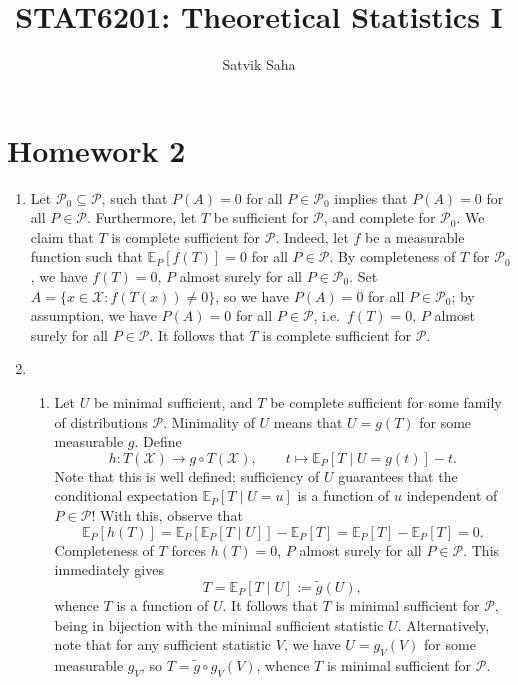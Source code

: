 \documentclass[11pt]{article}
\title{\bfseries STAT6201: Theoretical Statistics I}
\author{Satvik Saha}
\date{}
\begin{document}
    \maketitle

    \section*{Homework 2}

    \begin{enumerate}

    \item Let $\mathcal{P}_0 \subseteq \mathcal{P}$, such that $P(A) = 0$ for
    all $P \in \mathcal{P}_0$ implies that $P(A) = 0$ for all $P \in
    \mathcal{P}$.
    Furthermore, let $T$ be sufficient for $\mathcal{P}$, and complete for
    $\mathcal{P}_0$.
    We claim that $T$ is complete sufficient for $\mathcal{P}$.
    Indeed, let $f$ be a measurable function such that $\mathbb{E}_P[f(T)] =
    0$ for all $P \in \mathcal{P}$.
    By completeness of $T$ for $\mathcal{P}_0$, we have $f(T) = 0$, $P$ almost
    surely for all $P \in \mathcal{P}_0$.
    Set $A = \{x \in \mathcal{X}\colon f(T(x)) \neq 0\}$, so we have $P(A) =
    0$ for all $P \in \mathcal{P}_0$; by assumption, we have $P(A) = 0$ for
    all $P \in \mathcal{P}$, i.e.\ $f(T) = 0$, $P$ almost surely for all $P
    \in \mathcal{P}$.
    It follows that $T$ is complete sufficient for $\mathcal{P}$.


    \item \begin{enumerate}
        \item Let $U$ be minimal sufficient, and $T$ be complete sufficient
        for some family of distributions $\mathcal{P}$.
        Minimality of $U$ means that $U = g(T)$ for some measurable $g$.
        Define \[
            h\colon T(\mathcal{X}) \to g\circ T (\mathcal{X}), \qquad
            t \mapsto \mathbb{E}_P\left[T\mid U = g(t)\right] - t.
        \] Note that this is well defined; sufficiency of $U$ guarantees that
        the conditional expectation $\mathbb{E}_P[T \mid U = u]$ is a function
        of $u$ independent of $P \in \mathcal{P}$!
        With this, observe that \[
            \mathbb{E}_P\left[h(T)\right]
                = \mathbb{E}_P\left[\mathbb{E}_P[T\mid U]\right] - \mathbb{E}_P[T]
                = \mathbb{E}_P\left[T\right] - \mathbb{E}_P[T]
                = 0.
        \] Completeness of $T$ forces $h(T) = 0$, $P$ almost surely for all $P
        \in \mathcal{P}$.
        This immediately gives \[
            T = \mathbb{E}_P[T\mid U] := \tilde{g}(U),
        \] whence $T$ is a function of $U$.
        It follows that $T$ is minimal sufficient for $\mathcal{P}$, being in
        bijection with the minimal sufficient statistic $U$.
        Alternatively, note that for any sufficient statistic $V$, we have $U
        = g_V(V)$ for some measurable $g_V$, so $T = \tilde{g}\circ g_V (V)$,
        whence $T$ is minimal sufficient for $\mathcal{P}$.



\end{enumerate}
\end{enumerate}
\end{document}
